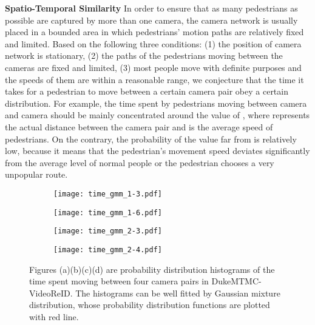 \documentclass[10pt,twocolumn,letterpaper]{article}
\begin{document}
\noindent \textbf{Spatio-Temporal Similarity}
In order to ensure that as many pedestrians as possible are captured by more than one camera, the camera network is usually placed in a bounded area in which pedestrians' motion paths are relatively fixed and limited. Based on the following three conditions: (1) the position of camera network is stationary, (2) the paths of the pedestrians moving between the cameras are fixed and limited, (3) most people move with definite purposes and the speeds of them are within a reasonable range, we conjecture that the time it takes for a pedestrian to move between a certain camera pair obey a certain distribution. For example, the time spent by pedestrians moving between camera  and camera  should be mainly concentrated around the value of , where  represents the actual distance between the camera pair and  is the average speed of pedestrians. On the contrary, the probability of the value far from  is relatively low, because it means that the pedestrian's movement speed deviates significantly from the average level of normal people or the pedestrian chooses a very unpopular route.

\begin{figure}
  \begin{subfigure}[t]{.23\textwidth}
    \centering
    \texttt{[image: time\_gmm\_1-3.pdf]}
    \caption{}
  \end{subfigure}
  \hfill
  \begin{subfigure}[t]{.23\textwidth}
    \centering
    \texttt{[image: time\_gmm\_1-6.pdf]}
    \caption{}
  \end{subfigure}

  \medskip

  \begin{subfigure}[t]{.23\textwidth}
    \centering
    \texttt{[image: time\_gmm\_2-3.pdf]}
    \caption{}
  \end{subfigure}
  \hfill
  \begin{subfigure}[t]{.23\textwidth}
    \centering
    \texttt{[image: time\_gmm\_2-4.pdf]}
    \caption{}
  \end{subfigure}
  
  \caption{Figures (a)(b)(c)(d) are probability distribution histograms of the time spent moving between four camera pairs in DukeMTMC-VideoReID. The histograms can be well fitted by Gaussian mixture distribution, whose probability distribution functions are plotted with red line.}
  \label{fig:gmm}
\end{figure}
\end{document}
